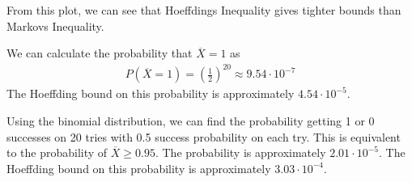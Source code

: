 From this plot, we can see that Hoeffdings Inequality gives tighter bounds than Markovs Inequality.

We can calculate the probability that $\overline{X} = 1$ as 
\begin{align}
P(\overline{X} = 1) = \left( \frac{1}{2} \right)^{20} \approx 9.54 \cdot 10^{-7}
\end{align}
The Hoeffding bound on this probability is approximately $4.54 \cdot 10^{-5}$.

Using the binomial distribution, we can find the probability getting 1 or 0 successes on 20 tries with 0.5 success probability on each try. This is equivalent to the probability of $\overline{X} \geq 0.95$. The probability is approximately $2.01 \cdot 10^{-5}$. The Hoeffding bound on this probability is approximately $3.03 \cdot 10^{-4}$.